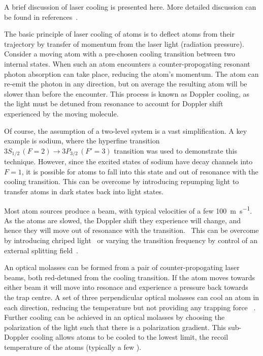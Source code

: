 A brief discussion of laser cooling is presented here. More detailed discussion
can be found in references~\cite{Metcalf1999,RevModPhys.70.721,McCarron_2018}.

The basic principle of laser cooling of atoms is to deflect atoms from their
trajectory by transfer of momentum from the laser light (radiation
pressure).~\cite{RevModPhys.70.721} Consider a moving atom with a
pre-chosen cooling transition between two internal states.  When such an atom
encounters a counter-propogating resonant photon absorption can take place,
reducing the atom's momentum. The atom can re-emit the photon in any direction,
but on average the resulting atom will be slower than before the encounter.
This process is known as Doppler cooling, as the light must be detuned from
resonance to account for Doppler shift experienced by the moving
molecule.~\cite{Metcalf1999}

Of course, the assumption of a two-level system is a vast simplification.  A key
example is sodium, where the hyperfine transition $3S_{1/2}\, (F=2) \rightarrow
3P_{3/2}\, (F'=3)$ transition was used to demonstrate this technique. However,
since the excited states of sodium have decay channels into $F=1$, it is
possible for atoms to fall into this state and out of resonance with the
cooling transition.  This can be overcome by introducing repumping light to
transfer atoms in dark states back into light states.~\cite{RevModPhys.70.721}

Most atom sources produce a beam, with typical velocities of a few
\SI{100}{\metre\per\second}.~\cite{Metcalf1999,}  As the atoms are slowed, the
Doppler shift they experience will change, and hence they will move out of
resonance with the transition.~\cite{RevModPhys.70.721} This can be overcome by
introducing chriped light~\cite{Prodan1984} or varying the transition frequency
by control of an external splitting field~\cite{PhysRevLett.48.596}.

An optical molasses can be formed from a pair of counter-propogating laser
beams, both red-detuned from the cooling transition. If the atom moves towards
either beam it will move into resonace and experience a pressure back towards
the trap centre. A set of three perpendicular optical molasses can cool an atom
in each direction, reducing the temperature but not providing any trapping
force~\cite{Metcalf1999} . Further cooling can be achieved in an optical
molasses by choosing the polarization of the light such that there is a
polarization gradient. This sub-Doppler cooling allows atoms to be cooled to the
lowest limit, the recoil temperature of the atoms (typically a few
\cm{\si{\micro\kelvin}}).~\cite{Dalibard:89}

